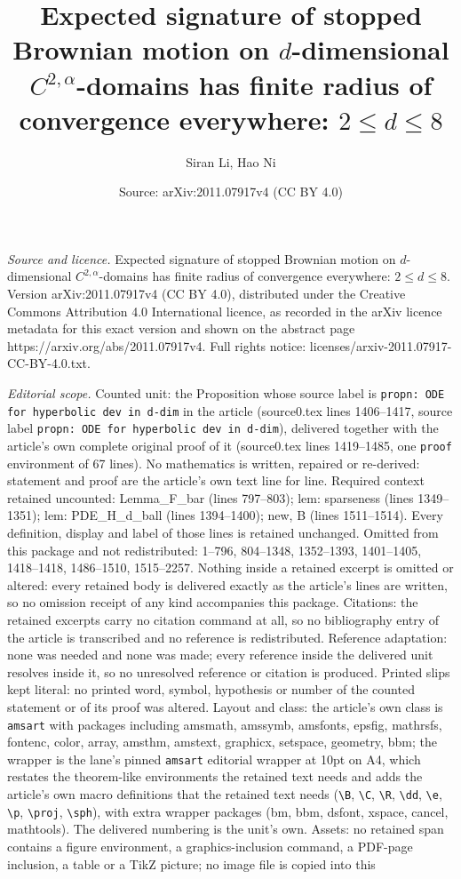 \documentclass[10pt,a4paper]{amsart}
\title[Expected signature of stopped Brownian motion on $d$-dimensi]{Expected signature of stopped Brownian motion on $d$-dimensional $C^{2, \alpha}$-domains has finite radius of convergence everywhere: $2\leq d \leq 8$}
\author{Siran Li, Hao Ni}
\date{Source: arXiv:2011.07917v4 (CC BY 4.0)}
\begin{document}
\maketitle

\noindent\emph{Source and licence.} Expected signature of stopped Brownian motion on $d$-dimensional $C^{2, \alpha}$-domains has finite radius of convergence everywhere: $2\leq d \leq 8$. Version arXiv:2011.07917v4 (CC BY 4.0), distributed under the Creative Commons Attribution 4.0 International licence, as recorded in the arXiv licence metadata for this exact version and shown on the abstract page https://arxiv.org/abs/2011.07917v4. Full rights notice: licenses/arxiv-2011.07917-CC-BY-4.0.txt.\par\smallskip

\noindent\textit{Editorial scope.} Counted unit: the Proposition whose source label is \texttt{propn: ODE for hyperbolic dev in d-dim} in the article (source0.tex lines 1406--1417, source label \texttt{propn: ODE for hyperbolic dev in d-dim}), delivered together with the article's own complete original proof of it (source0.tex lines 1419--1485, one \texttt{proof} environment of 67 lines). No mathematics is written, repaired or re-derived: statement and proof are the article's own text line for line. Required context retained uncounted: Lemma\_F\_bar (lines 797--803); lem: sparseness (lines 1349--1351); lem: PDE\_H\_d\_ball (lines 1394--1400); new, B (lines 1511--1514). Every definition, display and label of those lines is retained unchanged. Omitted from this package and not redistributed: 1--796, 804--1348, 1352--1393, 1401--1405, 1418--1418, 1486--1510, 1515--2257. Nothing inside a retained excerpt is omitted or altered: every retained body is delivered exactly as the article's lines are written, so no omission receipt of any kind accompanies this package. Citations: the retained excerpts carry no citation command at all, so no bibliography entry of the article is transcribed and no reference is redistributed. Reference adaptation: none was needed and none was made; every reference inside the delivered unit resolves inside it, so no unresolved reference or citation is produced. Printed slips kept literal: no printed word, symbol, hypothesis or number of the counted statement or of its proof was altered. Layout and class: the article's own class is \texttt{amsart} with packages including amsmath, amssymb, amsfonts, epsfig, mathrsfs, fontenc, color, array, amsthm, amstext, graphicx, setspace, geometry, bbm; the wrapper is the lane's pinned \texttt{amsart} editorial wrapper at 10pt on A4, which restates the theorem-like environments the retained text needs and adds the article's own macro definitions that the retained text needs (\texttt{\textbackslash B}, \texttt{\textbackslash C}, \texttt{\textbackslash R}, \texttt{\textbackslash dd}, \texttt{\textbackslash e}, \texttt{\textbackslash p}, \texttt{\textbackslash proj}, \texttt{\textbackslash sph}), with extra wrapper packages (bm, bbm, dsfont, xspace, cancel, mathtools). The delivered numbering is the unit's own. Assets: no retained span contains a figure environment, a graphics-inclusion command, a PDF-page inclusion, a table or a TikZ picture; no image file is copied into this 
\end{document}
